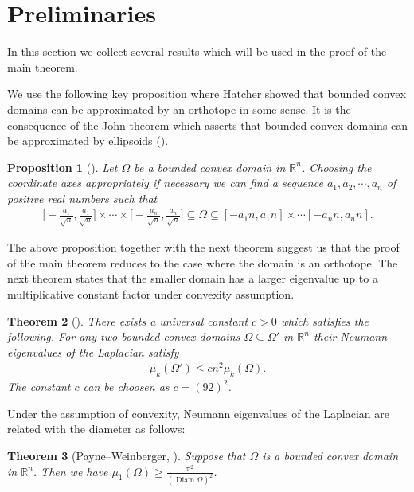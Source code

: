 \documentclass[12pt]{amsart}
\theoremstyle{plain}
\newtheorem{thm}{Theorem}[section]
\newtheorem{prop}[thm]{Proposition}
\theoremstyle{remark}
\newcommand{\diam}{\operatorname{Diam}}
\begin{document}
\section{Preliminaries}

In this section we collect several results which will be used in the proof of the main theorem.

We use the following key proposition where Hatcher showed that bounded convex domains can be approximated by an orthotope in some sense. It is the consequence of the John theorem which asserts that bounded convex domains can be approximated by ellipsoids (\cite[Theorem III]{J}). 

\begin{prop}[{\cite[Proposition 2.3]{H}}]\label{Hacher lem} Let $\Omega$ be a bounded convex domain in $\mathbb{R}^n$. Choosing the coordinate axes appropriately if necessary we can find a sequence $a_1,a_2,\cdots, a_n$ of positive real numbers such that  
    \begin{align*}
       \Big[-\frac{a_1}{\sqrt{n}},\frac{a_1}{\sqrt{n}}\Big]\times \cdots \times \Big[-\frac{a_n}{\sqrt{n}},\frac{a_n}{\sqrt{n}}\Big]\subseteq  \Omega\subseteq [-a_1 n, a_1 n]\times \cdots [-a_n n, a_n n].
    \end{align*}
\end{prop}

The above proposition together with the next theorem suggest us that the proof of the main theorem reduces to the case where the domain is an orthotope.
The next theorem states that the smaller domain has a larger eigenvalue up to a multiplicative constant factor under convexity assumption.
\begin{thm}[{\cite[Theorem 1.1]{F}}]\label{domain monotonicity}There exists a universal constant $c>0$ which satisfies the following. For any two
bounded convex domains $\Omega\subseteq \Omega'$ in $\mathbb{R}^n$ their Neumann eigenvalues of the Laplacian satisfy
    \begin{align*}
        \mu_k(\Omega')\leq c n^2\mu_k(\Omega).
    \end{align*}The constant $c$ can be choosen as $c=(92)^2$.
\end{thm}

Under the assumption of convexity, Neumann eigenvalues of the Laplacian are related with the diameter as follows:
\begin{thm}[{Payne–Weinberger, \cite[(1.9)]{PW}}]\label{Diamthm}Suppose that $\Omega$ is a bounded convex domain in $\mathbb{R}^n$. Then we have $\mu_1(\Omega)\geq \frac{\pi^2}{(\diam \Omega)^2}$.
\end{thm}
\end{document}
